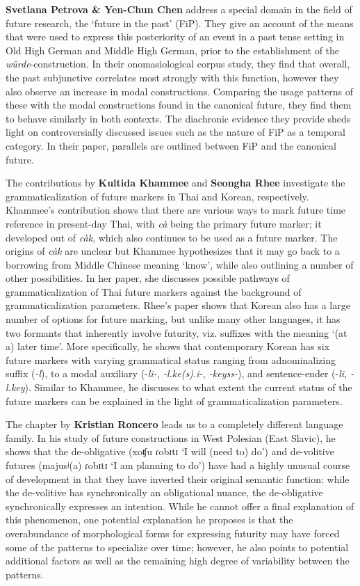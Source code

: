 \documentclass[output=paper,colorlinks,citecolor=brown]{langscibook}
\begin{document}
\textbf{Svetlana Petrova \& Yen-Chun Chen} address a special domain in the field of future research, the ‘future in the past’ (FiP). They give an account of the means that were used to express this posteriority of an event in a past tense setting in Old High German and Middle High German, prior to the establishment of the \textit{würde}-construction. In their onomasiological corpus study, they find that overall, the past subjunctive correlates most strongly with this function, however they also observe an increase in modal constructions. Comparing the usage patterns of these with the modal constructions found in the canonical future, they find them to behave similarly in both contexts. The diachronic evidence they provide sheds light on controversially discussed issues such as the nature of FiP as a temporal category. In their paper, parallels are outlined between FiP and the canonical future.

The contributions by \textbf{Kultida Khammee} and \textbf{Seongha Rhee} investigate the grammaticalization of future markers in Thai and Korean, respectively. Khammee's contribution shows that there are various ways to mark future time reference in present-day Thai, with \textit{cà}  being the primary future marker; it developed out of \textit{càk}, which also continues to be used as a future marker. The origins of \textit{càk} are unclear but Khammee hypothesizes that it may go back to a  borrowing from Middle Chinese meaning ‘know’, while also outlining a number of other possibilities. In her paper, she discusses possible pathways of grammaticalization of Thai future markers against the background of  grammaticalization parameters. Rhee's paper shows that Korean also has a large number of options for future marking, but unlike many other languages, it has two formants that inherently involve futurity, viz. suffixes with the meaning `(at a) later time'. More specifically, he shows that contemporary Korean has six future markers with varying grammatical status ranging from adnominalizing suffix (\textit{-l}), to a modal auxiliary (-\textit{li-, -l.ke(s).i-, -keyss-}), and sentence-ender (-\textit{li, -l.key}). Similar to Khammee, he discusses to what extent the current status of the future markers can be explained in the light of  grammaticalization parameters. 

The chapter by \textbf{Kristian Roncero} leads us to a completely different language family. In his study of future constructions in West Polesian (East Slavic), he shows that the de-obligative (xoʧu ɾobɪtɪ ‘I will (need to) do’) and de-volitive futures (majusʲ(a) ɾobɪtɪ ‘I am planning to do’) have had a highly unusual course of development in that they have inverted their original semantic function: while the de-volitive has synchronically an obligational nuance, the de-obligative synchronically expresses an intention. While he cannot offer a final explanation of this phenomenon, one potential explanation he proposes is that the overabundance of morphological forms for expressing futurity may have forced some of the patterns to specialize over time; however, he also points to potential additional factors as well as the remaining high degree of variability between the patterns. 
\end{document}
